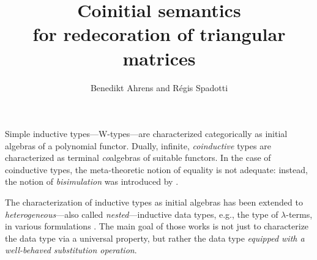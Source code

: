 \documentclass{llncs}
\begin{document}
\title{Coinitial semantics \\ for redecoration of triangular matrices}

\author{Benedikt Ahrens and R\'egis Spadotti}



%   
%   

\maketitle




 Simple inductive types---\textsf{W}-types---are characterized categorically as initial algebras of
 a polynomial functor.
 Dually, infinite, \emph{coinductive} types are characterized as terminal \emph{co}algebras of suitable functors.
 In the case of coinductive types, the meta-theoretic notion of equality is not adequate: instead, the notion of 
 \emph{bisimulation} was introduced by \textcite{aczel_nonwellfounded}.

 
 The characterization of inductive types as initial algebras 
 has been extended to \emph{heterogeneous}---also called \emph{nested}---inductive data types, e.g., the type of $\lambda$-terms,
 in various formulations \parencite{fpt, DBLP:journals/iandc/HirschowitzM10}.
 The main goal of those works is not just to characterize the data type via a universal property, but rather the data type
 \emph{equipped with a well-behaved substitution operation}.
 
\end{document}
